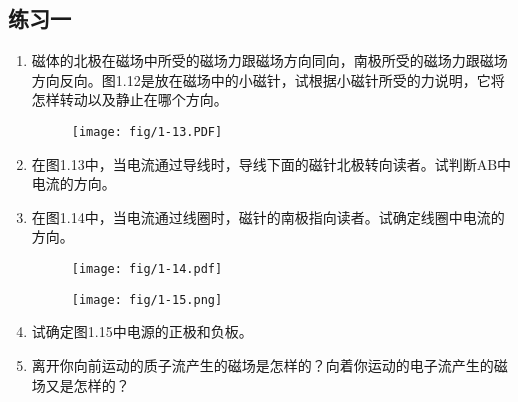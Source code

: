 \subsection*{练习一}
\begin{enumerate}
    \item 磁体的北极在磁场中所受的磁场力跟磁场方向同向，南极所受的磁场力跟磁场方向反向。图1.12是放在磁场中的小磁针，试根据小磁针所受的力说明，它将怎样转动以及静止在哪个方向。
\begin{figure}[htp]
\centering
\begin{minipage}[t]{0.48\textwidth}
\centering
{}
\caption{}
\end{minipage}
\begin{minipage}[t]{0.48\textwidth}
\centering
\texttt{[image: fig/1-13.PDF]}
\caption{}
\end{minipage}
\end{figure}
    \item 在图1.13中，当电流通过导线时，导线下面的磁针北极转向读者。试判断AB中电流的方向。
    \item 在图1.14中，当电流通过线圈时，磁针的南极指向读者。试确定线圈中电流的方向。
\begin{figure}[htp]
\centering
\begin{minipage}[t]{0.48\textwidth}
\centering
\texttt{[image: fig/1-14.pdf]}
\caption{}
\end{minipage}
\begin{minipage}[t]{0.48\textwidth}
\centering
\texttt{[image: fig/1-15.png]}
\caption{}
\end{minipage}
\end{figure}

    \item 试确定图1.15中电源的正极和负板。
    \item 离开你向前运动的质子流产生的磁场是怎样的？向着你运动的电子流产生的磁场又是怎样的？
\end{enumerate}

